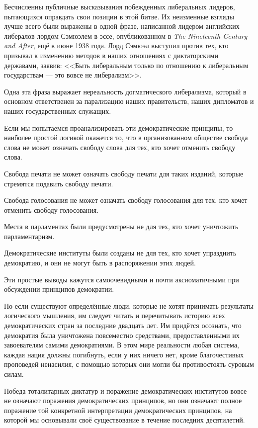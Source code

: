 Бесчисленны публичные высказывания побежденных либеральных лидеров, пытающихся оправдать свои позиции в этой битве. Их неизменные взгляды лучше всего были выражены в одной фразе, написанной лидером английских либералов лордом Сэмюэлем в эссе, опубликованном в \textit{The Nineteenth Century and After}, ещё в июне 1938 года. Лорд Сэмюэл выступил против тех, кто призывал к изменению методов в наших отношениях с диктаторскими державами, заявив: <<Быть либеральным только по отношению к либеральным государствам — это вовсе не либерализм>>.

Одна эта фраза выражает нереальность догматического либерализма, который в основном ответственен за парализацию наших правительств, наших дипломатов и наших государственных служащих.

Если мы попытаемся проанализировать эти демократические принципы, то наиболее простой логикой окажется то, что в организованном обществе свобода слова не может означать свободу слова для тех, кто хочет отменить свободу слова.

Свобода печати не может означать свободу печати для таких изданий, которые стремятся подавить свободу печати.

Свобода голосования не может означать свободу голосования для тех, кто хочет отменить свободу голосования.

Места в парламентах были предусмотрены не для тех, кто хочет уничтожить парламентаризм.

Демократические институты были созданы не для тех, кто хочет упразднить демократию, и они не могут быть в распоряжении этих людей.

Эти простые выводы кажутся самоочевидными и почти аксиоматичными при обсуждении принципов демократии.

Но если существуют определённые люди, которые не хотят принимать результаты логического мышления, им следует читать и перечитывать историю всех демократических стран за последние двадцать лет. Им придётся осознать, что демократия была уничтожена повсеместно средствами, предоставленными их завоевателям самими демократиями. В этом мире реальности любая система, каждая нация должны погибнуть, если у них ничего нет, кроме благочестивых проповедей ненасилия, с помощью которых они могли бы противостоять суровым силам.

Победа тоталитарных диктатур и поражение демократических институтов вовсе не означают поражения демократических принципов, но они означают полное поражение той конкретной интерпретации демократических принципов, на которой мы основывали своё существование в течение последних десятилетий.

